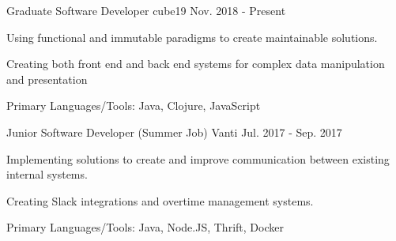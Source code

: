 

\begin{cventries}


  \cventry
    {Graduate Software Developer} %
    {cube19} %
    {} %
    {Nov. 2018 - Present} %
    {
      \begin{cvmitems} %
        \item {Using functional and immutable paradigms to create maintainable
          solutions.}
        \item {Creating both front end and back end systems for complex data
          manipulation and presentation}
        \item {Primary Languages/Tools: Java, Clojure, JavaScript}
      \end{cvmitems}
    }


  \cventry
    {Junior Software Developer (Summer Job)} %
    {Vanti} %
    {} %
    {Jul. 2017 - Sep. 2017} %
    {
      \begin{cvmitems} %
        \item {Implementing solutions to create and improve communication between existing internal systems.}
        \item {Creating Slack integrations and overtime management systems.}
        \item {Primary Languages/Tools: Java, Node.JS, Thrift, Docker}
      \end{cvmitems}
    }



\end{cventries}
